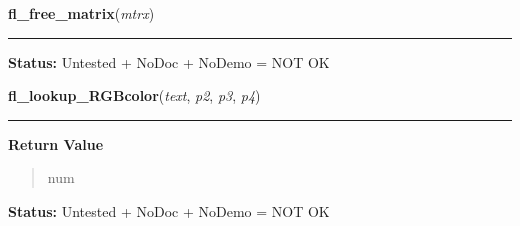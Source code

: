     \vspace{0.5ex}

\hspace{.8\funcindent}\begin{boxedminipage}{\funcwidth}

    \raggedright \textbf{fl\_free\_matrix}(\textit{mtrx})

    \vspace{-1.5ex}

    \rule{\textwidth}{0.5\fboxrule}
\setlength{\parskip}{2ex}
\setlength{\parskip}{1ex}
\textbf{Status:} Untested + NoDoc + NoDemo = NOT OK



    \end{boxedminipage}

    \label{xformslib:library:fl_lookup_RGBcolor}

    \vspace{0.5ex}

\hspace{.8\funcindent}\begin{boxedminipage}{\funcwidth}

    \raggedright \textbf{fl\_lookup\_RGBcolor}(\textit{text}, \textit{p2}, \textit{p3}, \textit{p4})

    \vspace{-1.5ex}

    \rule{\textwidth}{0.5\fboxrule}
\setlength{\parskip}{2ex}
\setlength{\parskip}{1ex}
      \textbf{Return Value}
    \vspace{-1ex}

      \begin{quote}
      num

      \end{quote}

\textbf{Status:} Untested + NoDoc + NoDemo = NOT OK



    \end{boxedminipage}

    \label{xformslib:library:flimage_add_format}

    \vspace{0.5ex}

